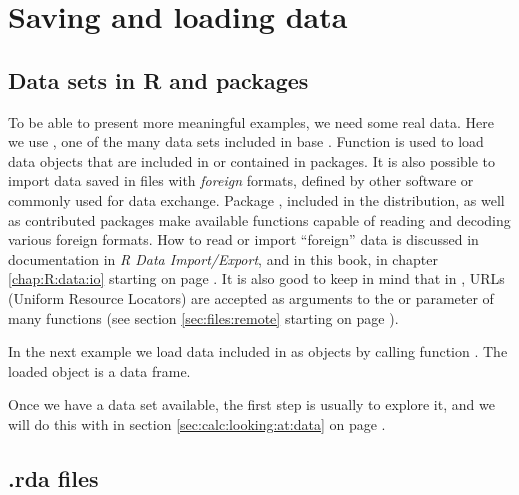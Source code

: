 \documentclass[krantz2]{krantz}\usepackage{knitr}
\begin{document}

\section{Saving and loading data}

\subsection{Data sets in R and packages}
To be able to present more meaningful examples, we need some real data. Here we use , one of the many data sets included in base \Rpgrm. Function  is used to load data objects that are included in \Rlang or contained in packages. It is also possible to import data saved in files with \textit{foreign} formats, defined by other software or commonly used for data exchange. Package , included in the \Rlang distribution, as well as contributed packages make available functions capable of reading and decoding various foreign formats. How to read or import ``foreign'' data is discussed in \Rlang documentation in \emph{R Data Import/Export}, and in this book, in chapter \ref{chap:R:data:io} starting on page \pageref{chap:R:data:io}. It is also good to keep in mind that in \Rlang, URLs (Uniform Resource Locators) are accepted as arguments to the  or  parameter of many functions (see section \ref{sec:files:remote} starting on page \pageref{sec:files:remote}).

In the next example we load data included in \Rlang as \Rlang objects by calling function . The loaded \Rlang object  is a data frame.

\begin{knitrout}\footnotesize
{}\color{fgcolor}\begin{kframe}
\begin{alltt}
\end{alltt}
\end{kframe}
\end{knitrout}

Once we have a data set available, the first step is usually to explore it, and we will do this with  in section \ref{sec:calc:looking:at:data} on page \pageref{sec:calc:looking:at:data}.

\subsection{.rda files}\label{sec:data:rda}
\end{document}
